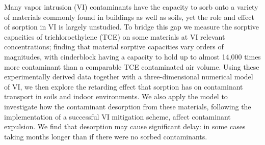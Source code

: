 Many vapor intrusion (VI) contaminants have the capacity to sorb onto a variety of materials commonly found in buildings as well as soils, yet the role and effect of sorption in VI is largely unstudied.
To bridge this gap we measure the sorptive capacities of trichloroethylene (TCE) on some materials at VI relevant concentrations; finding that material sorptive capacities vary orders of magnitudes, with cinderblock having a capacity to hold up to almost 14,000 times more contaminant than a comparable TCE contaminated air volume.
Using these experimentally derived data together with a three-dimensional numerical model of VI, we then explore the retarding effect that sorption has on contaminant transport in soils and indoor environments.
We also apply the model to investigate how the contaminant desorption from these materials, following the implementation of a successful VI mitigation scheme, affect contaminant expulsion.
We find that desorption may cause significant delay: in some cases taking months longer than if there were no sorbed contaminants.
